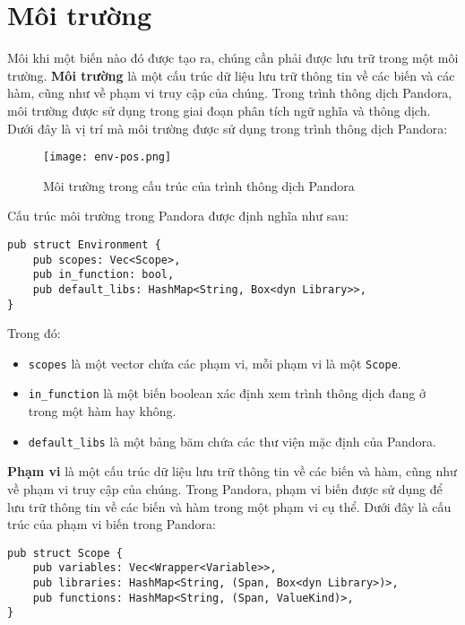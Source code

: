 \section{Môi trường}

    Môi khi một biến nào đó được tạo ra, chúng cần phải được lưu trữ trong một môi trường. \textbf{Môi trường} là một cấu trúc dữ liệu lưu trữ thông tin về các biến và các hàm, cũng như về phạm vi truy cập của chúng. Trong trình thông dịch Pandora, môi trường được sử dụng trong giai đoạn phân tích ngữ nghĩa và thông dịch. Dưới đây là vị trí mà  môi trường được sử dụng trong trình thông dịch Pandora:

\begin{figure}[H]
    \centering
    \texttt{[image: env-pos.png]}
    \caption{Môi trường trong cấu trúc của trình thông dịch Pandora}
\end{figure}

\noindent Cấu trúc môi trường trong Pandora được định nghĩa như sau:

\begin{lstlisting}[]
pub struct Environment {
    pub scopes: Vec<Scope>,
    pub in_function: bool,
    pub default_libs: HashMap<String, Box<dyn Library>>,
}
\end{lstlisting}

    Trong đó:
    \begin{itemize}
        \item \texttt{scopes} là một vector chứa các phạm vi, mỗi phạm vi là một \texttt{Scope}.
        \item \texttt{in\_function} là một biến boolean xác định xem trình thông dịch đang ở trong một hàm hay không.
        \item \texttt{default\_libs} là một bảng băm chứa các thư viện mặc định của Pandora.
    \end{itemize}

    \textbf{Phạm vi} là một cấu trúc dữ liệu lưu trữ thông tin về các biến và hàm, cũng như về phạm vi truy cập của chúng. Trong Pandora, phạm vi biến được sử dụng để lưu trữ thông tin về các biến và hàm trong một phạm vi cụ thể. Dưới đây là cấu trúc của phạm vi biến trong Pandora:

\begin{lstlisting}[]
pub struct Scope {
    pub variables: Vec<Wrapper<Variable>>,
    pub libraries: HashMap<String, (Span, Box<dyn Library>)>,
    pub functions: HashMap<String, (Span, ValueKind)>,      
}
\end{lstlisting}

